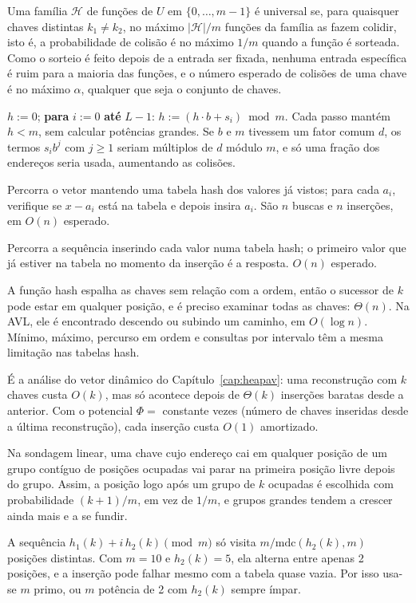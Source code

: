  Uma família $\mathcal H$ de funções de $U$ em $\{0,\dots,m-1\}$ é universal se, para quaisquer chaves distintas $k_1\ne k_2$, no máximo $|\mathcal H|/m$ funções da família as fazem colidir, isto é, a probabilidade de colisão é no máximo $1/m$ quando a função é sorteada. Como o sorteio é feito depois de a entrada ser fixada, nenhuma entrada específica é ruim para a maioria das funções, e o número esperado de colisões de uma chave é no máximo $\alpha$, qualquer que seja o conjunto de chaves.

 $h:=0$; \textbf{para} $i:=0$ \textbf{até} $L-1$: $h:=(h\cdot b+s_i)\bmod m$. Cada passo mantém $h<m$, sem calcular potências grandes. Se $b$ e $m$ tivessem um fator comum $d$, os termos $s_ib^j$ com $j\ge1$ seriam múltiplos de $d$ módulo $m$, e só uma fração dos endereços seria usada, aumentando as colisões.

 Percorra o vetor mantendo uma tabela hash dos valores já vistos; para cada $a_i$, verifique se $x-a_i$ está na tabela e depois insira $a_i$. São $n$ buscas e $n$ inserções, em $O(n)$ esperado.

 Percorra a sequência inserindo cada valor numa tabela hash; o primeiro valor que já estiver na tabela no momento da inserção é a resposta. $O(n)$ esperado.

 A função hash espalha as chaves sem relação com a ordem, então o sucessor de $k$ pode estar em qualquer posição, e é preciso examinar todas as chaves: $\Theta(n)$. Na AVL, ele é encontrado descendo ou subindo um caminho, em $O(\log n)$. Mínimo, máximo, percurso em ordem e consultas por intervalo têm a mesma limitação nas tabelas hash.

 É a análise do vetor dinâmico do Capítulo~\ref{cap:heapav}: uma reconstrução com $k$ chaves custa $O(k)$, mas só acontece depois de $\Theta(k)$ inserções baratas desde a anterior. Com o potencial $\Phi=$ constante vezes (número de chaves inseridas desde a última reconstrução), cada inserção custa $O(1)$ amortizado.

 Na sondagem linear, uma chave cujo endereço cai em qualquer posição de um grupo contíguo de posições ocupadas vai parar na primeira posição livre depois do grupo. Assim, a posição logo após um grupo de $k$ ocupadas é escolhida com probabilidade $(k+1)/m$, em vez de $1/m$, e grupos grandes tendem a crescer ainda mais e a se fundir.

 A sequência $h_1(k)+i\,h_2(k)\pmod m$ só visita $m/\mathrm{mdc}(h_2(k),m)$ posições distintas. Com $m=10$ e $h_2(k)=5$, ela alterna entre apenas 2 posições, e a inserção pode falhar mesmo com a tabela quase vazia. Por isso usa-se $m$ primo, ou $m$ potência de 2 com $h_2(k)$ sempre ímpar.

